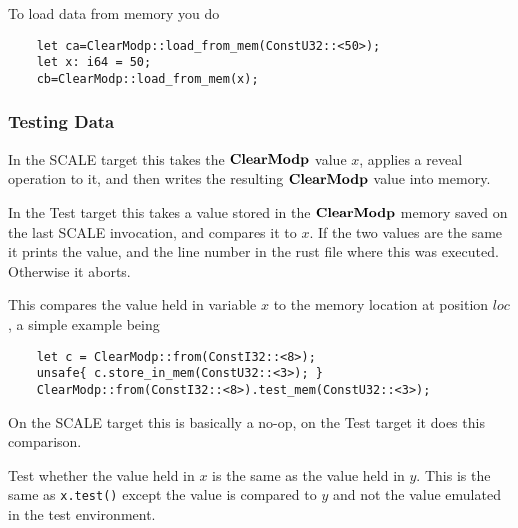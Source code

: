 To load data from memory you do
\begin{lstlisting}
    let ca=ClearModp::load_from_mem(ConstU32::<50>);
    let x: i64 = 50;
    cb=ClearModp::load_from_mem(x);
\end{lstlisting}


\subsubsection{Testing Data}
In the SCALE target this takes the $\mathbf{ClearModp}$ value $x$,
applies a reveal operation to it, and then writes the
resulting $\mathbf{ClearModp}$ value into memory.

In the Test target this takes a value stored in the $\mathbf{ClearModp}$
memory saved on the last SCALE invocation, and compares it to
$x$. If the two values are the same it prints the value, and the
line number in the rust file where this was executed.
Otherwise it aborts.

This compares the value held in variable $x$ to the memory location
at position $loc$, a simple example being
\begin{lstlisting}
    let c = ClearModp::from(ConstI32::<8>);
    unsafe{ c.store_in_mem(ConstU32::<3>); }
    ClearModp::from(ConstI32::<8>).test_mem(ConstU32::<3>);
\end{lstlisting}
On the SCALE target this is basically a no-op, on the Test target
it does this comparison.

Test whether the value held in $x$ is the same as the value held in $y$.
This is the same as \verb|x.test()| except the value is compared to
$y$ and not the value emulated in the test environment.
